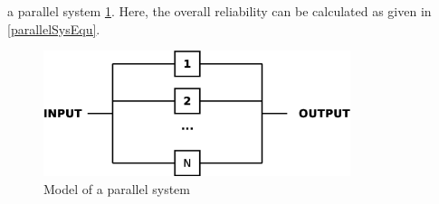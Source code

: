 a parallel system \ref{fig:parallelSys}. Here, the overall reliability can be calculated as given in \ref{parallelSysEqu}.
\begin{figure}
    \centering
    \includegraphics[width=0.8\textwidth]{figures/parallelSys.eps}
    \caption{Model of a parallel system}
    \label{fig:parallelSys}
\end{figure}

